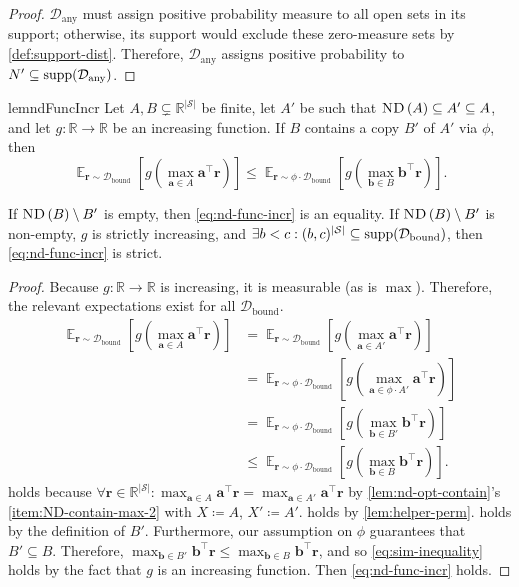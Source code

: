 \documentclass{article}
\renewcommand{\abs}[1]{\left|#1\right|}
\newcommand*{\prn}[1]{\left(#1\right)}
\newcommand*{\brx}[1]{\left[#1\right]}
\newcommand*{\defeq}{\coloneqq} %
\newcommand*{\av}{\mathbf{a}}
\newcommand*{\bv}{\mathbf{b}}
\newcommand*{\reals}{\mathbb{R}}
\newcommand*{\upsc}[1]{\text{\upshape\textsc{#1}}}
\newcommand*{\St}{\mathcal{S}}
\newcommand*{\rf}{\mathbf{r}} %
\newcommand*{\rewardVS}{\reals^{\abs{\St}}} %
\newcommand*{\D}{\mathcal{D}} %
\newcommand*{\Dany}{\D_{\text{any}}}
\newcommand*{\Dbd}{\D_{\text{bound}}}
\DeclareMathOperator*{\opE}{\mathbb{E}}
\newcommand*{\E}[2]{\opE_{#1}\brx{#2}} %
\newcommand*{\ND}[1]{\upsc{ND}\prn{#1}}
\theoremstyle{definition}
\begin{document}
\begin{appendices}
\begin{proof}
$\Dany$ must assign positive probability measure to all open sets in its support; otherwise, its support would exclude these zero-measure sets by \cref{def:support-dist}. Therefore, $\Dany$ assigns positive probability to $N'\subseteq \supp[\Dany]$. 
\end{proof}   

\begin{restatable}{lem}{ndFuncIncr}\label{lem:nd-func-incr-pwr}
Let $A,B\subsetneq \rewardVS$ be finite, let $A'$ be such that $\ND{A}\subseteq A'\subseteq A$, and let $g:\reals\to\reals$ be an increasing function. If $B$ contains a copy $B'$ of $A'$ via $\phi$, then
\begin{equation}
    \E{\rf \sim \Dbd}{g\prn{\max_{\av\in A}\av^\top \rf}} \leq \E{\rf \sim \phi\cdot \Dbd}{g\prn{\max_{\bv\in B}\bv^\top \rf}}.\label{eq:nd-func-incr}
\end{equation} 

If $\ND{B}\setminus B'$ is empty, then \cref{eq:nd-func-incr} is an equality. If $\ND{B}\setminus B'$ is non-empty, $g$ is strictly increasing, and $\exists b<c: (b,c)^{\abs{\St}}\subseteq\supp[\Dbd]$, then \cref{eq:nd-func-incr} is strict.
\end{restatable}
\begin{proof}
Because $g:\reals\to\reals$ is increasing, it is measurable (as is $\max$). Therefore, the relevant expectations exist for all $\Dbd$.
\begin{align}
     \E{\rf \sim \Dbd}{g\prn{\max_{\av\in A}\av^\top \rf}} &=\E{\rf \sim \Dbd}{g\prn{\max_{\av\in A'}\av^\top \rf}}\label{eq:nd-func-incr-restr}\\
     &=\E{\rf \sim \phi\cdot \Dbd}{g\prn{\max_{\av\in \phi\cdot A'}\av^\top \rf}}\label{eq:apply-helper}\\
     &=\E{\rf \sim \phi\cdot \Dbd}{g\prn{\max_{\bv\in B'}\bv^\top \rf}}\label{eq:sim-helper}\\
     &\leq\E{\rf \sim \phi\cdot \Dbd}{g\prn{\max_{\bv\in B}\bv^\top \rf}}.\label{eq:sim-inequality}
\end{align}
 holds because $\forall \rf\in\rewardVS:\max_{\av\in A}\av^\top \rf=\max_{\av\in A'}\av^\top \rf$ by \cref{lem:nd-opt-contain}'s \cref{item:ND-contain-max-2} with $X\defeq A$, $X'\defeq A'$.  holds by \cref{lem:helper-perm}.  holds by the definition of $B'$. Furthermore, our assumption on $\phi$ guarantees that $B'\subseteq B$. Therefore, $\max_{\bv\in B'}\bv^\top \rf\leq \max_{\bv\in B}\bv^\top \rf$, and so \cref{eq:sim-inequality} holds by the fact that $g$ is an increasing function. Then \cref{eq:nd-func-incr} holds. 


\end{proof}
\end{appendices}
\end{document}

